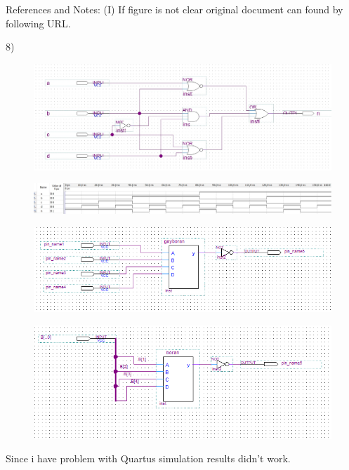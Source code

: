 \documentclass[11pt]{report}
\begin{document}
References and Notes:
(I) If figure is not clear original document can found by following URL.

8)
 \begin{figure}[H]
  \includegraphics[width=\linewidth]{bos}
  \caption{ }
  \label{fig:zero}
\end{figure}

 \begin{figure}[H]
  \includegraphics[width=\linewidth]{boos}
  \caption{ }
  \label{fig:zero}
\end{figure}
 \begin{figure}[H]
  \includegraphics[width=\linewidth]{sim}
  \caption{ }
  \label{fig:zero}
\end{figure}
 \begin{figure}[H]
  \includegraphics[width=\linewidth]{boran}
  \caption{ }
  \label{fig:zero}
\end{figure}
Since i have problem with Quartus simulation results didn't work.
\end{document}
